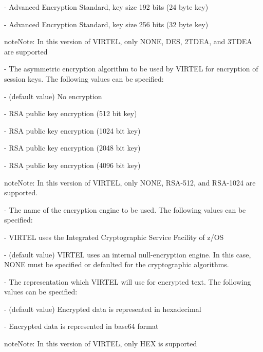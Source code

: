 \documentclass[letterpaper,10pt,english]{sphinxmanual}
\begin{document}
 - Advanced Encryption Standard, key size 192 bits (24 byte key)

 - Advanced Encryption Standard, key size 256 bits (32 byte key)

\begin{sphinxadmonition}{note}{Note:}
In this version of VIRTEL, only NONE, DES, 2TDEA, and 3TDEA are supported
\end{sphinxadmonition}

 - The asymmetric encryption algorithm to be used by VIRTEL for encryption of session keys. The following values can be specified:

 - (default value) No encryption

 - RSA public key encryption (512 bit key)

 - RSA public key encryption (1024 bit key)

 - RSA public key encryption (2048 bit key)

 - RSA public key encryption (4096 bit key)

\begin{sphinxadmonition}{note}{Note:}
In this version of VIRTEL, only NONE, RSA-512, and RSA-1024 are supported.
\end{sphinxadmonition}

 - The name of the encryption engine to be used. The following values can be specified:

 - VIRTEL uses the Integrated Cryptographic Service Facility of z/OS

 - (default value) VIRTEL uses an internal null-encryption engine. In this case, NONE must be specified or defaulted for the cryptographic algorithms.

 - The representation which VIRTEL will use for encrypted text. The following values can be specified:

 - (default value) Encrypted data is represented in hexadecimal

 - Encrypted data is represented in base64 format

\begin{sphinxadmonition}{note}{Note:}
In this version of VIRTEL, only HEX is supported
\end{sphinxadmonition}
\end{document}
